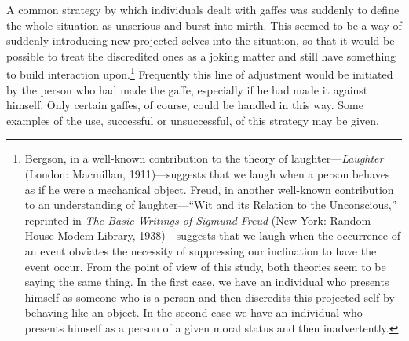 \documentclass[openany,nobib]{tufte-book}
\begin{document}
\noindent A common strategy by which individuals dealt with gaffes was suddenly to
define the whole situation as unserious and burst into mirth. This
seemed to be a way of suddenly introducing new projected selves into the
situation, so that it would be possible to treat the discredited ones as
a joking matter and still have something to build interaction
upon.\footnote{Bergson, in a well-known contribution to the theory of
  laughter---\emph{Laughter} (London: Macmillan, 1911)---suggests that
  we laugh when a person behaves as if he were a mechanical object.
  Freud, in another well-known contribution to an understanding of
  laughter---``Wit and its Relation to the Unconscious,'' reprinted in
  \emph{The Basic Writings of Sigmund Freud} (New York: Random
  House-Modem Library, 1938)---suggests that we laugh when the
  occurrence of an event obviates the necessity of suppressing our
  inclination to have the event occur. From the point of view of this
  study, both theories seem to be saying the same thing. In the first
  case, we have an individual who presents himself as someone who is a
  person and then discredits this projected self by behaving like an
  object. In the second case we have an individual who presents himself
  as a person of a given moral status and then inadvertently.} Frequently this line of adjustment would be
initiated by the person who had made the gaffe, especially if he had
made it against himself. Only certain gaffes, of course, could be
handled in this way. Some examples of the use, successful or
unsuccessful, of this strategy may be given.
\end{document}
